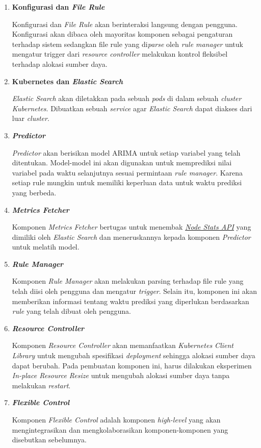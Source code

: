 \begin{enumerate}
    \item \textbf{Konfigurasi dan \textit{File Rule}}
    
    Konfigurasi dan \textit{File Rule} akan berinteraksi langsung dengan pengguna. Konfigurasi akan dibaca oleh mayoritas komponen sebagai pengaturan terhadap sistem sedangkan file rule yang di\textit{parse} oleh \textit{rule manager} untuk mengatur trigger dari \textit{resource controller} melakukan kontrol fleksibel terhadap alokasi sumber daya.

    \item \textbf{Kubernetes dan \textit{Elastic Search}}
    
    \textit{Elastic Search} akan diletakkan pada sebuah \textit{pods} di dalam sebuah \textit{cluster Kubernetes}. Dibuatkan sebuah \textit{service} agar \textit{Elastic Search} dapat diakses dari luar \textit{cluster}.
    
    \item \textbf{\textit{Predictor}}
    
    \textit{Predictor} akan berisikan model ARIMA untuk setiap variabel yang telah ditentukan. Model-model ini akan digunakan untuk memprediksi nilai variabel pada waktu selanjutnya sesuai permintaan \textit{rule manager}. Karena setiap rule mungkin untuk memiliki keperluan data untuk waktu prediksi yang berbeda.

    \item \textbf{\textit{Metrics Fetcher}}
    
    Komponen \textit{Metrics Fetcher} bertugas untuk menembak \href{https://www.elastic.co/guide/en/elasticsearch/reference/current/cluster-nodes-stats.html}{\textit{Node Stats API}} yang dimiliki oleh \textit{Elastic Search} dan meneruskannya kepada komponen \textit{Predictor} untuk melatih model.

    \item \textbf{\textit{Rule Manager}}
    
    Komponen \textit{Rule Manager} akan melakukan parsing terhadap file rule yang telah diisi oleh pengguna dan mengatur \textit{trigger}. Selain itu, komponen ini akan memberikan informasi tentang waktu prediksi yang diperlukan berdasarkan \textit{rule} yang telah dibuat oleh pengguna.

    \item \textbf{\textit{Resource Controller}}
    
    Komponen \textit{Resource Controller} akan memanfaatkan \textit{Kubernetes Client Library} untuk mengubah spesifikasi \textit{deployment} sehingga alokasi sumber daya dapat berubah. Pada pembuatan komponen ini, harus dilakukan eksperimen \textit{In-place Resource Resize} untuk mengubah alokasi sumber daya tanpa melakukan \textit{restart}.

    \item \textbf{\textit{Flexible Control}}
    
    Komponen \textit{Flexible Control} adalah komponen \textit{high-level} yang akan mengintegrasikan dan mengkolaborasikan komponen-komponen yang disebutkan sebelumnya.
\end{enumerate}

